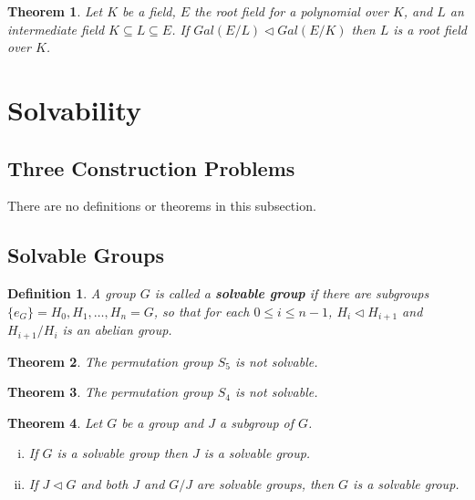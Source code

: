 \documentclass[letterpaper, 12pt]{article}
\newtheorem{defn}{Definition}
\newtheorem{thm}{Theorem}
\begin{document}
			\begin{thm}
			Let $K$ be a field, $E$ the root field for a polynomial over $K$, and $L$ an intermediate field $K \subseteq L \subseteq E$.
			If $Gal(E/L) \triangleleft Gal(E/K)$ then $L$ is a root field over $K$.
			\end{thm}

	\section{Solvability}
	\label{sec:solvability}
		\setcounter{defn}{0}
		\setcounter{thm}{0}

		\subsection{Three Construction Problems}
		\label{sec:three_construction_problems}
			There are no definitions or theorems in this subsection.

		\subsection{Solvable Groups}
		\label{sec:solvable_groups}
			\begin{defn}
			A group $G$ is called a \textbf{solvable group} if there are subgroups $\{ e_{G} \} = H_{0}, H_{1}, \dots, H_{n} = G$, so that for each $0 \leq i \leq n - 1$, $H_{i} \triangleleft H_{i+1}$ and $H_{i+1} / H_{i}$ is an abelian group. 
			\end{defn}

			\setcounter{thm}{2}
			\begin{thm}
			The permutation group $S_{5}$ is not solvable.
			\end{thm}

			\begin{thm}
			The permutation group $S_{4}$ is not solvable.
			\end{thm}

			\begin{thm}
			Let $G$ be a group and $J$ a subgroup of $G$.
				\begin{enumerate}[(i)]
				\item If $G$ is a solvable group then $J$ is a solvable group.
				\item If $J \triangleleft G$ and both $J$ and $G/J$ are solvable groups, then $G$ is a solvable group.
				\end{enumerate}
			\end{thm}
\end{document}
